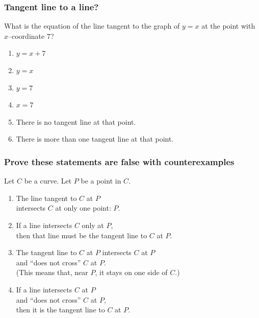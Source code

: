 \documentclass[14pt]{beamer}
\date{}
\title{}
\author{}
\begin{document}





	\begin{frame}[t]
		\frametitle{Tangent line to a line?}

		What is the equation of the line tangent to the graph of $y=x$ at the point
		with $x$--coordinate $7$?

		\begin{enumerate}
			\item $\displaystyle y=x+7$

			\item $\displaystyle y=x$

			\item $\displaystyle y=7$

			\item $\displaystyle x=7$

			\item There is no tangent line at that point.

			\item There is more than one tangent line at that point.
		\end{enumerate}
	\end{frame}

	\begin{frame}
		\frametitle{Prove these statements are false with counterexamples}

		Let $C$ be a curve. Let $P$ be a point in $C$.
		\vfill
		\begin{enumerate}
			\item The line tangent to $C$ at $P$ \\ intersects $C$ at only one point:
				$P$.
				\vfill

			\item If a line intersects $C$ only at $P$, \\ then that line must be the
				tangent line to $C$ at $P$.
				\vfill

			\item The tangent line to $C$ at $P$ intersects $C$ at $P$ \\ and ``does not
				cross'' $C$ at $P$. \\ (This means that, near $P$, it stays on one side of
				$C$.)
				\vfill

			\item If a line intersects $C$ at $P$ \\ and ``does not cross'' $C$ at $P$,
				\\ then it is the tangent line to $C$ at $P$.
				\vfill
		\end{enumerate}
	\end{frame}
\end{document}
